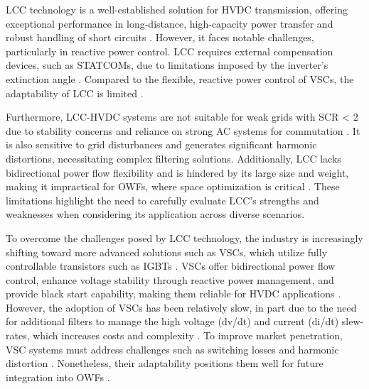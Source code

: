 \documentclass{ieeeaccess}
\begin{document}
LCC technology is a well-established solution for HVDC transmission, offering exceptional performance in long-distance, high-capacity power transfer and robust handling of short circuits \cite{oni2016review,flourentzou2009vsc,singh2022voltage}. However, it faces notable challenges, particularly in reactive power control. LCC requires external compensation devices, such as STATCOMs, due to limitations imposed by the inverter's extinction angle \cite{xue2016reactive}. Compared to the flexible, reactive power control of VSCs, the adaptability of LCC is limited \cite{oni2016review,buigues2017present,fein2013dual,yang2022critical}.

Furthermore, LCC-HVDC systems are not suitable for weak grids with SCR < 2 due to stability concerns and reliance on strong AC systems for commutation \cite{lu2017evaluation}. %
It is also sensitive to grid disturbances and generates significant harmonic distortions, necessitating complex filtering solutions. Additionally, LCC lacks bidirectional power flow flexibility and is hindered by its large size and weight, making it impractical for OWFs, where space optimization is critical \cite{ryndzionek2020evolution,blasco2012lcc}. These limitations highlight the need to carefully evaluate LCC's strengths and weaknesses when considering its application across diverse scenarios.

To overcome the challenges posed by LCC technology, the industry is increasingly shifting toward more advanced solutions such as VSCs, which utilize fully controllable transistors such as IGBTs \cite{flourentzou2009vsc}. VSCs offer bidirectional power flow control, enhance voltage stability through reactive power management, and provide black start capability, making them reliable for HVDC applications \cite{koondhar2023critical,zhang2022coordinated}. However, the adoption of VSCs has been relatively slow, in part due to the need for additional filters to manage the high voltage (dv/dt) and current (di/dt) slew-rates, which increases costs and complexity \cite{flourentzou2009vsc,jiang2018day}. To improve market penetration, VSC systems must address challenges such as switching losses and harmonic distortion \cite{buigues2017present,yang2022critical}. Nonetheless, their adaptability positions them well for future integration into OWFs \cite{oni2016review,xu2023amplitude}.
\end{document}
